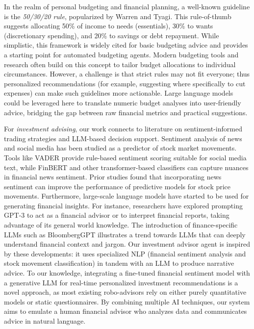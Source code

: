 \documentclass{scrartcl}
\begin{document}
In the realm of personal budgeting and financial planning, a well-known guideline is the \textit{50/30/20 rule}, popularized by Warren and Tyagi. This rule-of-thumb suggests allocating 50\% of income to needs (essentials), 30\% to wants (discretionary spending), and 20\% to savings or debt repayment. While simplistic, this framework is widely cited for basic budgeting advice and provides a starting point for automated budgeting agents. Modern budgeting tools and research often build on this concept to tailor budget allocations to individual circumstances. However, a challenge is that strict rules may not fit everyone; thus personalized recommendations (for example, suggesting where specifically to cut expenses) can make such guidelines more actionable. Large language models could be leveraged here to translate numeric budget analyses into user-friendly advice, bridging the gap between raw financial metrics and practical suggestions.

For \textit{investment advising}, our work connects to literature on sentiment-informed trading strategies and LLM-based decision support. Sentiment analysis of news and social media has been studied as a predictor of stock market movements. Tools like VADER provide rule-based sentiment scoring suitable for social media text, while FinBERT and other transformer-based classifiers can capture nuances in financial news sentiment. Prior studies found that incorporating news sentiment can improve the performance of predictive models for stock price movements. Furthermore, large-scale language models have started to be used for generating financial insights. For instance, researchers have explored prompting GPT-3 to act as a financial advisor or to interpret financial reports, taking advantage of its general world knowledge. The introduction of finance-specific LLMs such as BloombergGPT illustrates a trend towards LLMs that can deeply understand financial context and jargon. Our investment advisor agent is inspired by these developments: it uses specialized NLP (financial sentiment analysis and stock movement classification) in tandem with an LLM to produce narrative advice. To our knowledge, integrating a fine-tuned financial sentiment model with a generative LLM for real-time personalized investment recommendations is a novel approach, as most existing robo-advisors rely on either purely quantitative models or static questionnaires. By combining multiple AI techniques, our system aims to emulate a human financial advisor who analyzes data and communicates advice in natural language.
\end{document}
